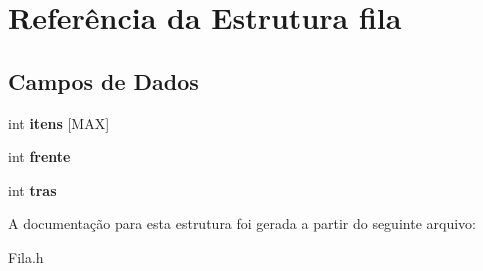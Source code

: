 \hypertarget{structfila}{\section{Referência da Estrutura fila}
\label{structfila}
}
\subsection*{Campos de Dados}
\begin{DoxyCompactItemize}
\item 
\hypertarget{structfila_a995eb5d9f5bbd2ffe0bdaa5266f19f56}{int {\bfseries itens} \mbox{[}M\+A\+X\mbox{]}}\label{structfila_a995eb5d9f5bbd2ffe0bdaa5266f19f56}

\item 
\hypertarget{structfila_a9db6fe2b3364e372eff7bde475bf507d}{int {\bfseries frente}}\label{structfila_a9db6fe2b3364e372eff7bde475bf507d}

\item 
\hypertarget{structfila_ac3d7381220418320d00c6fce7575f452}{int {\bfseries tras}}\label{structfila_ac3d7381220418320d00c6fce7575f452}

\end{DoxyCompactItemize}


A documentação para esta estrutura foi gerada a partir do seguinte arquivo\+:\begin{DoxyCompactItemize}
\item 
Fila.\+h\end{DoxyCompactItemize}
